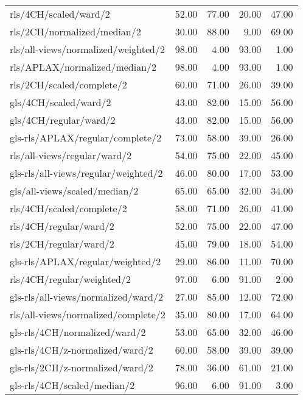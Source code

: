 \begin{longtable}{lrrrr}
    rls/4CH/scaled/ward/2                     & 52.00 & 77.00 & 20.00 & 47.00 \\
    rls/2CH/normalized/median/2               & 30.00 & 88.00 &  9.00 & 69.00 \\
    rls/all-views/normalized/weighted/2       & 98.00 &  4.00 & 93.00 &  1.00 \\
    rls/APLAX/normalized/median/2             & 98.00 &  4.00 & 93.00 &  1.00 \\
    rls/2CH/scaled/complete/2                 & 60.00 & 71.00 & 26.00 & 39.00 \\
    gls/4CH/scaled/ward/2                     & 43.00 & 82.00 & 15.00 & 56.00 \\
    gls/4CH/regular/ward/2                    & 43.00 & 82.00 & 15.00 & 56.00 \\
    gls-rls/APLAX/regular/complete/2          & 73.00 & 58.00 & 39.00 & 26.00 \\
    rls/all-views/regular/ward/2              & 54.00 & 75.00 & 22.00 & 45.00 \\
    gls-rls/all-views/regular/weighted/2      & 46.00 & 80.00 & 17.00 & 53.00 \\
    gls/all-views/scaled/median/2             & 65.00 & 65.00 & 32.00 & 34.00 \\
    rls/4CH/scaled/complete/2                 & 58.00 & 71.00 & 26.00 & 41.00 \\
    rls/4CH/regular/ward/2                    & 52.00 & 75.00 & 22.00 & 47.00 \\
    rls/2CH/regular/ward/2                    & 45.00 & 79.00 & 18.00 & 54.00 \\
    gls-rls/APLAX/regular/weighted/2          & 29.00 & 86.00 & 11.00 & 70.00 \\
    rls/4CH/regular/weighted/2                & 97.00 &  6.00 & 91.00 &  2.00 \\
    gls-rls/all-views/normalized/ward/2       & 27.00 & 85.00 & 12.00 & 72.00 \\
    rls/all-views/normalized/complete/2       & 35.00 & 80.00 & 17.00 & 64.00 \\
    gls-rls/4CH/normalized/ward/2             & 53.00 & 65.00 & 32.00 & 46.00 \\
    gls-rls/4CH/z-normalized/ward/2           & 60.00 & 58.00 & 39.00 & 39.00 \\
    gls-rls/2CH/z-normalized/ward/2           & 78.00 & 36.00 & 61.00 & 21.00 \\
    gls-rls/4CH/scaled/median/2               & 96.00 &  6.00 & 91.00 &  3.00 \\

\end{longtable}
